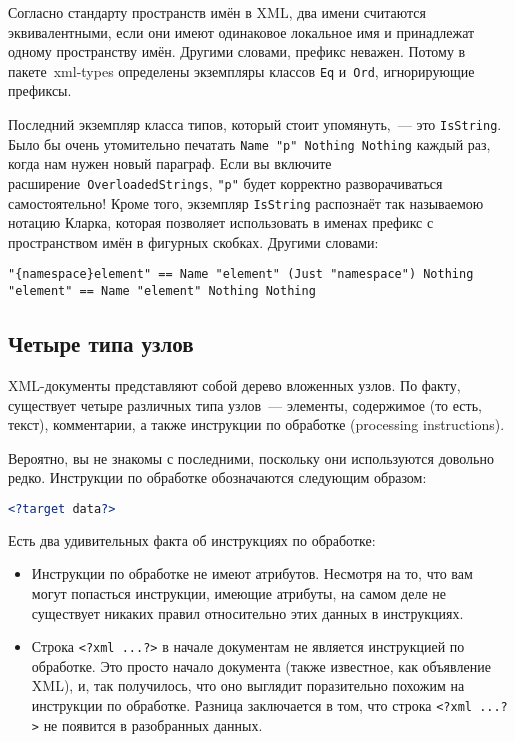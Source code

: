 Согласно стандарту пространств имён в XML, два имени считаются эквивалентными,
если они имеют одинаковое локальное имя и принадлежат одному пространству имён.
Другими словами, префикс неважен. Потому в пакете~xml-types
определены экземпляры классов \lstinline!Eq! и~\lstinline!Ord!, игнорирующие
префиксы.

Последний экземпляр класса типов, который стоит упомянуть,~--- это
\lstinline!IsString!. Было бы очень утомительно печатать
\lstinline!Name "p" Nothing Nothing!
каждый раз, когда нам нужен новый параграф. Если вы включите
расширение~\lstinline!OverloadedStrings!, \lstinline!"p"! будет
корректно разворачиваться самостоятельно! Кроме того, экземпляр
\lstinline!IsString! распознаёт так называемою нотацию Кларка, которая
позволяет использовать в именах префикс с пространством имён в фигурных
скобках. Другими словами:
\begin{lstlisting}
"{namespace}element" == Name "element" (Just "namespace") Nothing
"element" == Name "element" Nothing Nothing
\end{lstlisting}

\subsection{Четыре типа узлов} %
XML-документы представляют собой дерево вложенных узлов. По факту, существует
четыре различных типа узлов~--- элементы, содержимое (то есть, текст),
комментарии, а также инструкции по обработке (processing instructions).

\begin{remark}
    Вероятно, вы не знакомы с последними, поскольку они используются довольно
    редко. Инструкции по обработке обозначаются следующим образом:
    \begin{lstlisting}[language=XML]
    <?target data?>
    \end{lstlisting}

    Есть два удивительных факта об инструкциях по обработке:
    \begin{itemize}
    \item Инструкции по обработке не имеют атрибутов. Несмотря на то, что вам
        могут попасться инструкции, имеющие атрибуты, на самом деле не
        существует никаких правил относительно этих данных в инструкциях.

    \item Строка \lstinline!<?xml ...?>! в начале документам не является инструкцией по
        обработке. Это просто начало документа (также известное, как объявление
        XML), и, так получилось, что оно выглядит поразительно похожим на
        инструкции по обработке. Разница заключается в том, что строка
        \lstinline!<?xml ...?>! не появится в разобранных данных.
    \end{itemize}

\end{remark}

